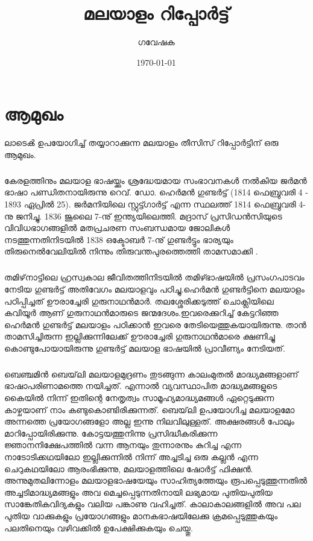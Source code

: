 \documentclass[11pt]{report}
\title{മലയാളം റിപ്പോർട്ട്}
\author{ഗവേഷക}
\date{\today}
\begin{document}



\newpage






\tableofcontents


\chapter{ആമുഖം}

ലാടെൿ ഉപയോഗിച്ച് തയ്യാറാക്കുന്ന മലയാളം തീസിസ് റിപ്പോർട്ടിന് ഒരു ആമുഖം.

\paragraph{}
 കേരളത്തിനും മലയാള ഭാഷയ്ക്കും ശ്രദ്ധേയമായ സംഭാവനകൾ നൽകിയ ജർമൻ ഭാഷാ പണ്ഡിതനായിരുന്നു റെവ്. ഡോ. ഹെർമൻ ഗുണ്ടർട്ട് (1814 ഫെബ്രുവരി 4 - 1893 ഏപ്രിൽ 25). ജർമനിയിലെ സ്റ്റുട്ട്ഗാർട്ട് എന്ന സ്ഥലത്ത് 1814 ഫെബ്രുവരി 4-നു ജനിച്ചു. 1836 ജൂലൈ 7-നു് ഇന്ത്യയിലെത്തി. മദ്രാസ് പ്രസിഡൻസിയുടെ വിവിധഭാഗങ്ങളിൽ മതപ്രചരണ സംബന്ധമായ ജോലികൾ നടത്തുന്നതിനിടയിൽ 1838 ഒക്ടോബർ 7-നു് ഗുണ്ടർട്ടും ഭാര്യയും തിരുനെൽവേലിയിൽ നിന്നും തിരുവന്തപുരത്തെത്തി താമസമാക്കി \cite{bailey}.

\paragraph{}
തമിഴ്‌നാട്ടിലെ ഹ്രസ്വകാല ജീവിതത്തിനിടയിൽ തമിഴ്ഭാഷയിൽ പ്രസംഗപാടവം നേടിയ ഗുണ്ടർട്ട് അതിവേഗം മലയാളവും പഠിച്ചു.ഹെർമൻ ഗുണ്ടർട്ടിനെ മലയാളം പഠിപ്പിച്ചത് ഊരാച്ചേരി ഗുരുനാഥൻമാർ. തലശ്ശേരിക്കടുത്ത് ചൊക്ലിയിലെ കവിയൂർ ആണ് ഗുരുനാഥൻമാരുടെ ജന്മദേശം.ഇവരെക്കുറിച്ച് കേട്ടറിഞ്ഞ ഹെർമൻ ഗുണ്ടർട്ട് മലയാളം പഠിക്കാൻ ഇവരെ തേടിയെത്തുകയായിരുന്നു. താൻ താമസിച്ചിരുന്ന ഇല്ലിക്കുന്നിലേക്ക് ഊരാച്ചേരി ഗുരുനാഥൻമാരെ ക്ഷണിച്ചു കൊണ്ടുപോയായിരുന്നു ഗുണ്ടർട്ട് മലയാള ഭാഷയിൽ പ്രാവീണ്യം നേടിയത്. 

\paragraph{}
ബെഞ്ചമിൻ ബെയ്‌ലി മലയാളമുദ്രണം തുടങ്ങുന്ന കാലംമുതൽ മാദ്ധ്യമങ്ങളാണ് ഭാഷാപരിണാമത്തെ നയിച്ചത്. എന്നാൽ വ്യവസ്ഥാപിത മാദ്ധ്യമങ്ങളുടെ കൈയിൽ നിന്ന് ഇതിന്റെ നേതൃത്വം സാമൂഹ്യമാദ്ധ്യമങ്ങൾ ഏറ്റെടുക്കുന്ന കാഴ്ചയാണ് നാം കണ്ടുകൊണ്ടിരിക്കുന്നത്. ബെയ്‌ലി ഉപയോഗിച്ച മലയാളമോ അന്നത്തെ പ്രയോഗങ്ങളോ അല്ല ഇന്നു നിലവിലുള്ളത്. അക്ഷരങ്ങൾ പോലും മാറിപ്പോയിരിക്കുന്നു. കോട്ടയത്തുനിന്നു പ്രസിദ്ധീകരിക്കുന്ന ജ്ഞാനനിക്ഷേപത്തിൽ വന്ന ആനയും തുന്നാരനും കുറിച്ച എന്ന നാടോടിക്കഥയിലോ ഇല്ലിക്കുന്നിൽ നിന്ന് അച്ചടിച്ച ഒരു കല്ലൻ എന്ന ചെറുകഥയിലോ ആരംഭിക്കുന്നു, മലയാളത്തിലെ ഷോർട്ട് ഫിക്ഷൻ. അന്നുമുതലിന്നോളം മലയാളഭാഷയേയും സാഹിത്യത്തേയും രൂപപ്പെടുത്തുന്നതിൽ അച്ചടിമാദ്ധ്യമങ്ങളും അവ മെച്ചപ്പെടുന്നതിനായി ലഭ്യമായ പുതിയപുതിയ സാങ്കേതികവിദ്യകളും വലിയ പങ്കാണു വഹിച്ചത്. കാലാകാലങ്ങളിൽ അവ പല പുതിയ വാക്കുകളും പ്രയോഗങ്ങളും മാനകഭാഷയിലേക്കു ക്രമപ്പെടുത്തുകയും പലതിനെയും വഴിവക്കിൽ ഉപേക്ഷിക്കുകയും ചെയ്തു. 
\end{document}
